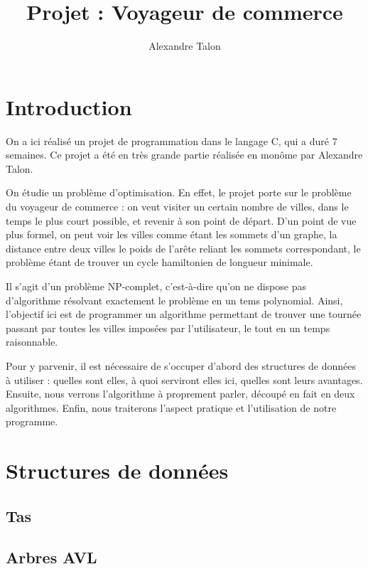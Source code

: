 \documentclass{article}
\title{Projet : Voyageur de commerce}
\author{Alexandre Talon}
\begin{document}
\maketitle
\tableofcontents

\section*{Introduction}
On a ici réalisé un projet de programmation dans le langage C, qui a duré 7 semaines. Ce projet a été en très grande partie réalisée en monôme par Alexandre Talon.

On étudie un problème d'optimisation. En effet, le projet porte sur le problème du voyageur de commerce : on veut visiter un certain nombre de villes, dans le temps le plus court possible, et revenir à son point de départ. D'un point de vue plus formel, on peut voir les villes comme étant les sommets d'un graphe, la distance entre deux villes le poids de l'arête reliant les sommets correspondant, le problème étant de trouver un cycle hamiltonien de longueur minimale.


Il s'agit d'un problème NP-complet, c'est-à-dire qu'on ne dispose pas d'algorithme résolvant exactement le problème en un tems polynomial. Ainsi, l'objectif ici est de programmer un algorithme permettant de trouver une tournée passant par toutes les villes imposées par l'utilisateur, le tout en un temps raisonnable.

Pour y parvenir, il est nécessaire de s'occuper d'abord des structures de données à utiliser : quelles sont elles, à quoi serviront elles ici, quelles sont leurs avantages. Ensuite, nous verrons l'algorithme à proprement parler, découpé en fait en deux algorithmes. Enfin, nous traiterons l'aspect pratique et l'utilisation de notre programme.

\section{Structures de données}


\subsection{Tas}

\subsection{Arbres AVL}
\end{document}
